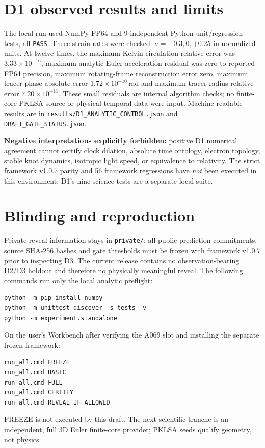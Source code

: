 \documentclass[10pt,a4paper]{article}
\begin{document}
\section{D1 observed results and limits}
The local run used NumPy FP64 and 9 independent Python unit/regression tests, all \texttt{PASS}. Three strain rates were checked: $a=-0.3,0,+0.25$ in normalized units. At twelve times, the maximum Kelvin-circulation relative error was $3.33\times10^{-16}$, maximum analytic Euler acceleration residual was zero to reported FP64 precision, maximum rotating-frame reconstruction error zero, maximum tracer phase absolute error $1.72\times10^{-10}\,$rad and maximum tracer radius relative error $7.20\times10^{-11}$. These small residuals are internal algorithm checks; no finite-core PKLSA source or physical temporal data were input. Machine-readable results are in \texttt{results/D1\_ANALYTIC\_CONTROL.json} and \texttt{DRAFT\_GATE\_STATUS.json}.

\textbf{Negative interpretations explicitly forbidden:} positive D1 numerical agreement cannot certify clock dilation, absolute time ontology, electron topology, stable knot dynamics, isotropic light speed, or equivalence to relativity. The strict framework v1.0.7 parity and 56 framework regressions have \emph{not} been executed in this environment; D1's nine science tests are a separate local suite.

\section{Blinding and reproduction}
Private reveal information stays in \texttt{private/}; all public prediction commitments, source SHA-256 hashes and gate thresholds must be frozen with framework v1.0.7 prior to inspecting D3. The current release contains no observation-bearing D2/D3 holdout and therefore no physically meaningful reveal. The following commands run only the local analytic preflight:
\begin{verbatim}
python -m pip install numpy
python -m unittest discover -s tests -v
python -m experiment.standalone
\end{verbatim}
On the user's Workbench after verifying the A069 slot and installing the separate frozen framework:\begin{verbatim}
run_all.cmd FREEZE
run_all.cmd BASIC
run_all.cmd FULL
run_all.cmd CERTIFY
run_all.cmd REVEAL_IF_ALLOWED
\end{verbatim}
FREEZE is not executed by this draft. The next scientific tranche is an independent, full 3D Euler finite-core provider; PKLSA seeds qualify geometry, not physics.
\end{document}
